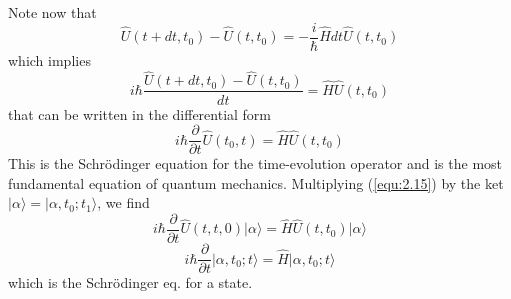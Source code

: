 Note now that
\begin{equation}
  \hat{U}(t+dt,t_0)-\hat{U}(t,t_0) = - \frac{i}{\hbar}
  \hat{H}dt \hat{U}(t,t_0)
  \label{equ:2.14}
\end{equation}
which implies
$$
i\hbar \frac{\hat{U}(t+dt,t_0)-\hat{U}(t,t_0)}{dt} =
\hat{H}\hat{U}(t,t_0)
$$
that can be written in the differential form
\begin{equation}
  i\hbar \frac{\partial}{\partial t}\hat{U}(t_0,t) = \hat{H}
  \hat{U}(t,t_0)
  \label{equ:2.15}
\end{equation}
This is the Schrödinger equation for the time-evolution
operator and is the most fundamental equation of quantum
mechanics.
Multiplying (\ref{equ:2.15}) by the ket $\vert \alpha\rangle  =
\vert \alpha,t_0;t_1\rangle $, we find
$$
i\hbar \frac{\partial}{\partial t} \hat{U}(t,t,0) \vert \alpha\rangle  =
\hat{H}\hat{U}(t,t_0) \vert \alpha\rangle 
$$
\begin{equation}
  i\hbar \frac{\partial}{\partial t} \vert \alpha,t_0;t\rangle  =
  \hat{H}\vert \alpha,t_0;t\rangle 
  \label{equ:2.16}
\end{equation}
which is the Schrödinger eq. for a state.

